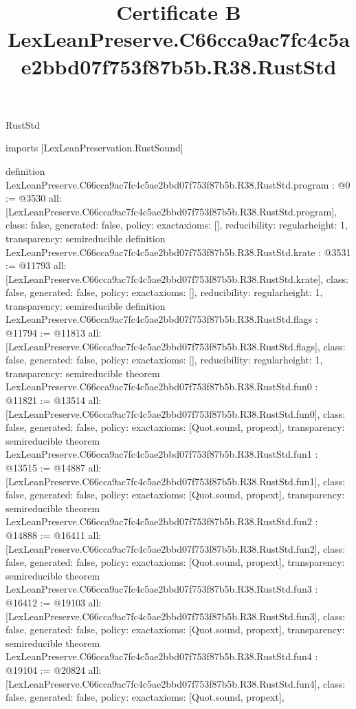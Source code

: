 \begin{lexlean}{RustStd}
\title{Certificate B LexLeanPreserve.C66cca9ac7fc4c5ae2bbd07f753f87b5b.R38.RustStd}
\begin{coremodule}
imports [LexLeanPreservation.RustSound]

definition LexLeanPreserve.C66cca9ac7fc4c5ae2bbd07f753f87b5b.R38.RustStd.program : @0 := @3530 {
  all: [LexLeanPreserve.C66cca9ac7fc4c5ae2bbd07f753f87b5b.R38.RustStd.program],
  class: false,
  generated: false,
  policy: exact{axioms: []},
  reducibility: regular{height: 1},
  transparency: semireducible
}
definition LexLeanPreserve.C66cca9ac7fc4c5ae2bbd07f753f87b5b.R38.RustStd.krate : @3531 := @11793 {
  all: [LexLeanPreserve.C66cca9ac7fc4c5ae2bbd07f753f87b5b.R38.RustStd.krate],
  class: false,
  generated: false,
  policy: exact{axioms: []},
  reducibility: regular{height: 1},
  transparency: semireducible
}
definition LexLeanPreserve.C66cca9ac7fc4c5ae2bbd07f753f87b5b.R38.RustStd.flags : @11794 := @11813 {
  all: [LexLeanPreserve.C66cca9ac7fc4c5ae2bbd07f753f87b5b.R38.RustStd.flags],
  class: false,
  generated: false,
  policy: exact{axioms: []},
  reducibility: regular{height: 1},
  transparency: semireducible
}
theorem LexLeanPreserve.C66cca9ac7fc4c5ae2bbd07f753f87b5b.R38.RustStd.fun0 : @11821 := @13514 {
  all: [LexLeanPreserve.C66cca9ac7fc4c5ae2bbd07f753f87b5b.R38.RustStd.fun0],
  class: false,
  generated: false,
  policy: exact{axioms: [Quot.sound, propext]},
  transparency: semireducible
}
theorem LexLeanPreserve.C66cca9ac7fc4c5ae2bbd07f753f87b5b.R38.RustStd.fun1 : @13515 := @14887 {
  all: [LexLeanPreserve.C66cca9ac7fc4c5ae2bbd07f753f87b5b.R38.RustStd.fun1],
  class: false,
  generated: false,
  policy: exact{axioms: [Quot.sound, propext]},
  transparency: semireducible
}
theorem LexLeanPreserve.C66cca9ac7fc4c5ae2bbd07f753f87b5b.R38.RustStd.fun2 : @14888 := @16411 {
  all: [LexLeanPreserve.C66cca9ac7fc4c5ae2bbd07f753f87b5b.R38.RustStd.fun2],
  class: false,
  generated: false,
  policy: exact{axioms: [Quot.sound, propext]},
  transparency: semireducible
}
theorem LexLeanPreserve.C66cca9ac7fc4c5ae2bbd07f753f87b5b.R38.RustStd.fun3 : @16412 := @19103 {
  all: [LexLeanPreserve.C66cca9ac7fc4c5ae2bbd07f753f87b5b.R38.RustStd.fun3],
  class: false,
  generated: false,
  policy: exact{axioms: [Quot.sound, propext]},
  transparency: semireducible
}
theorem LexLeanPreserve.C66cca9ac7fc4c5ae2bbd07f753f87b5b.R38.RustStd.fun4 : @19104 := @20824 {
  all: [LexLeanPreserve.C66cca9ac7fc4c5ae2bbd07f753f87b5b.R38.RustStd.fun4],
  class: false,
  generated: false,
  policy: exact{axioms: [Quot.sound, propext]},
}
\end{coremodule}
\end{lexlean}
